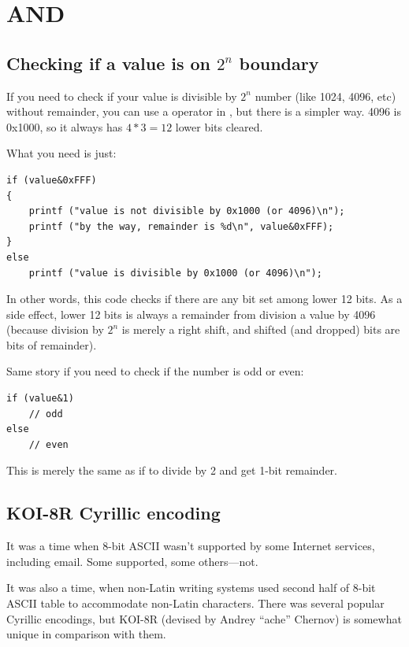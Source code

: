 \section{AND}

\subsection{Checking if a value is on $2^n$ boundary}

If you need to check if your value is divisible by $2^n$ number (like 1024, 4096, etc) without remainder,
you can use a \TT{\%} operator in \CCpp, but there is a simpler way.
4096 is 0x1000, so it always has $4*3=12$ lower bits cleared.

What you need is just:

\begin{lstlisting}
if (value&0xFFF)
{
	printf ("value is not divisible by 0x1000 (or 4096)\n");
	printf ("by the way, remainder is %d\n", value&0xFFF);
}
else
	printf ("value is divisible by 0x1000 (or 4096)\n");
\end{lstlisting}

In other words, this code checks if there are any bit set among lower 12 bits.
As a side effect, lower 12 bits is always a remainder from division a value by 4096 (because division by $2^n$
is merely a right shift, and shifted (and dropped) bits are bits of remainder).

Same story if you need to check if the number is odd or even:

\begin{lstlisting}
if (value&1)
	// odd
else
	// even
\end{lstlisting}

This is merely the same as if to divide by 2 and get 1-bit remainder.

\subsection{KOI-8R Cyrillic encoding}

It was a time when 8-bit \ac{ASCII} wasn't supported by some Internet services, including email.
Some supported, some others---not.

It was also a time, when non-Latin writing systems used second half of 8-bit ASCII table to accommodate non-Latin characters.
There was several popular Cyrillic encodings, but KOI-8R (devised by Andrey ``ache'' Chernov)
is somewhat unique in comparison with them.

